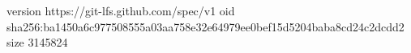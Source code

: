 version https://git-lfs.github.com/spec/v1
oid sha256:ba1450a6c977508555a03aa758e32e64979ee0bef15d5204baba8cd24c2dcdd2
size 3145824
